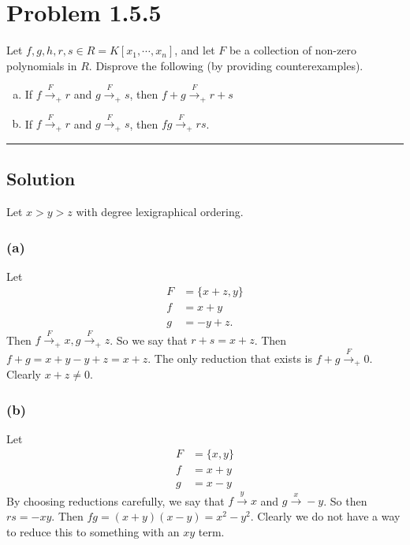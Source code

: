 \documentclass{article}
\theoremstyle{definition}
\begin{document}
\section*{Problem 1.5.5}
Let $f,g,h,r,s \in R = K[x_1,\cdots,x_n]$, and let $F$ be a collection of non-zero 
polynomials in $R$. Disprove the following (by providing counterexamples).
\begin{enumerate}[(a)]
    \item If $f \xrightarrow{F}_+r$ and $g \xrightarrow{F}_+s$, then $f+g\xrightarrow{F}_+r+s$ \\
    \item If $f\xrightarrow{F}_+r$ and $g\xrightarrow{F}_+s$, then $fg\xrightarrow{F}_+rs$.
\end{enumerate}
\par\noindent\rule{\textwidth}{0.4pt}
\subsection*{Solution}
Let $x > y > z$ with degree lexigraphical ordering.
\subsubsection*{(a)}
Let 
\begin{align*}
    F &= \{x+z, y\}\\
    f &= x + y \\
    g &= -y + z
.\end{align*}
Then $f \xrightarrow{F}_+ x, g \xrightarrow{F}_+ z$.
So we say that $r + s = x + z$.
Then $f + g = x + y - y + z = x + z$. The only reduction that 
exists is $f + g \xrightarrow{F}_+ 0$. Clearly $x + z \neq 0$.
\subsubsection*{(b)}
Let
\begin{align*}
    F &= \{x,y\} \\
    f &= x + y \\
    g &= x - y
\end{align*}
By choosing reductions carefully, we say that $f \xrightarrow{y} x$ and 
$g \xrightarrow{x} -y$. So then $rs = -xy$. Then $fg = (x + y)(x - y) = x^2 - y^2$.
Clearly we do not have a way to reduce this to something with an $xy$ term.
\end{document}
